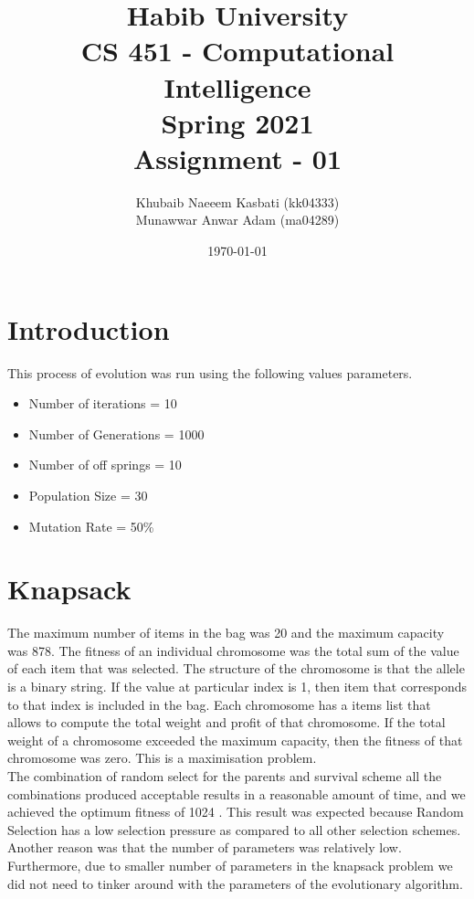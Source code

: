 \documentclass[a4paper]{article}
\title{Habib University \\ CS 451  - Computational Intelligence\\ Spring 2021  \\Assignment  - 01}
\author{Khubaib Naeeem Kasbati (kk04333) \\Munawwar Anwar Adam (ma04289)}
\date{\today}
\begin{document}
\setlength{\parskip}{10pt}
\setlength{\parindent}{0pt}
\maketitle

\section{Introduction}
This process of evolution was run using the following values parameters.
\begin{itemize}
\item Number of iterations = 10
\item Number of Generations = 1000
\item Number of off springs = 10
\item Population Size = 30
\item Mutation Rate = 50\%
\end{itemize}
\section{Knapsack}
The maximum number of items in the bag was 20 and the maximum capacity was 878. The fitness of an individual chromosome was the total sum of the value of each item that was selected. 
The structure of the chromosome is that the allele is a binary string. If the value at particular index is 1, then item that corresponds to that index is included in the bag. Each chromosome has a items list that
allows to compute the total weight and profit of that chromosome.
If the total weight of a chromosome exceeded the maximum capacity, then the fitness of that chromosome was zero. This is a maximisation problem. \\

The combination of random select for the parents and survival scheme all the combinations produced acceptable results in a reasonable amount of time, and we achieved the optimum fitness of 1024 .  
This result was expected because Random Selection has a low selection pressure as compared to all other selection schemes.  Another reason was that the number of parameters was relatively low. Furthermore, due to smaller number of
parameters in the knapsack problem we did not need to tinker around with the parameters of the evolutionary algorithm.
\end{document}
